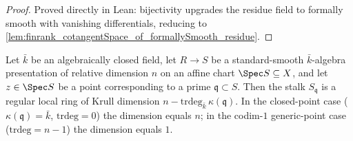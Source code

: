 \begin{proof}
  Proved directly in Lean: bijectivity upgrades the residue field to formally smooth
  with vanishing differentials, reducing to
  \cref{lem:finrank_cotangentSpace_of_formallySmooth_residue}.
\end{proof}

\begin{lemma}
  \label{lem:stage6_regular_stalk_assembly}
  Let \(\bar k\) be an algebraically closed field, let
  \(R \to S\) be a standard-smooth \(\bar k\)-algebra presentation of
  relative dimension \(n\) on an affine chart \(\Spec S \subseteq X\),
  and let \(z \in \Spec S\) be a point corresponding to a prime
  \(\mathfrak q \subset S\). Then the stalk \(S_{\mathfrak q}\) is a
  regular local ring of Krull dimension
  \(n - \mathrm{trdeg}_{\bar k}\,\kappa(\mathfrak q)\). In the
  closed-point case (\(\kappa(\mathfrak q) = \bar k\),
  \(\mathrm{trdeg} = 0\)) the dimension equals \(n\); in the
  codim-\(1\) generic-point case (\(\mathrm{trdeg} = n - 1\)) the
  dimension equals \(1\).
\end{lemma}

